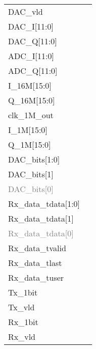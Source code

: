 \documentclass[journal,twoside]{IEEEtran}
\begin{document}
\begin{figure*}
  \setlength{\tabcolsep}{2pt}
  \sffamily\notsotiny
  \newcommand\Color{mygreen}
  \newcommand\Modulation{BPSK}%
  \newcommand\isBPSK1%
  \begin{tabularx}{\linewidth}{@{}lX@{}}
    DAC\_vld &  \\
    DAC\_I[11:0] &  \\
    DAC\_Q[11:0] &  \\
    ADC\_I[11:0] &  \\
    ADC\_Q[11:0] &  \\
    I\_16M[15:0] &  \\
    Q\_16M[15:0] &  \\
    clk\_1M\_out &  \\
    I\_1M[15:0] &  \\
    Q\_1M[15:0] &  \\
    DAC\_bits[1:0] &  \\
    DAC\_bits[1] &  \\
    \textcolor{gray}{DAC\_bits[0]} &  \\
    Rx\_data\_tdata[1:0] &  \\
    Rx\_data\_tdata[1] &  \\
    \textcolor{gray}{Rx\_data\_tdata[0]} &  \\
    Rx\_data\_tvalid &  \\
    Rx\_data\_tlast &  \\
    Rx\_data\_tuser &  \\
    Tx\_1bit &  \\
    Tx\_vld &  \\
    Rx\_1bit &  \\
    Rx\_vld &  \\
  \end{tabularx}%
\end{figure*}
\end{document}
